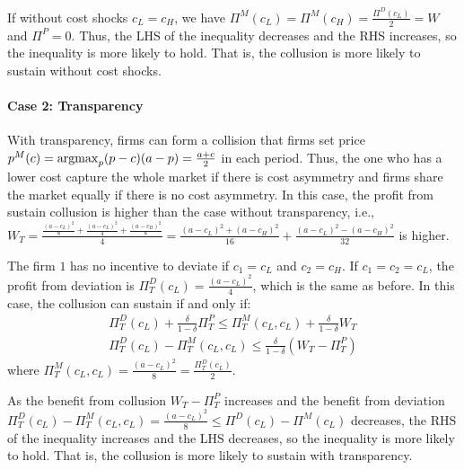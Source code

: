 \documentclass[12pt]{article}
\newcommand{\argmax}{\operatornamewithlimits{argmax}}
\begin{document}
If without cost shocks $c_L=c_H$, we have $\Pi^M(c_L)=\Pi^M(c_H)=\frac{\Pi^D(c_L)}{2}=W$ and $\Pi^P=0$. Thus, the LHS of the inequality decreases and the RHS increases, so the inequality is more likely to hold. That is, the collusion is more likely to sustain without cost shocks.

\paragraph{Case 2: Transparency}
With transparency, firms can form a collision that firms set price $p^M(c)=\argmax_p (p-c)(a-p)=\frac{a+c}{2}$ in each period. Thus, the one who has a lower cost capture the whole market if there is cost asymmetry and firms share the market equally if there is no cost asymmetry. In this case, the profit from sustain collusion is higher than the case without transparency, i.e., $W_T=\frac{\frac{(a-c_L)^2}{8}+\frac{(a-c_L)^2}{4}+\frac{(a-c_H)^2}{8}}{4}=\frac{(a-c_L)^2+(a-c_H)^2}{16}+\frac{(a-c_L)^2-(a-c_H)^2}{32}$ is higher.

The firm $1$ has no incentive to deviate if $c_1=c_L$ and $c_2=c_H$. If $c_1=c_2=c_L$, the profit from deviation is $\Pi^D_T(c_L)=\frac{(a-c_L)^2}{4}$, which is the same as before. In this case, the collusion can sustain if and only if:
\begin{equation}
    \begin{aligned}
        \Pi^D_T(c_L)+\frac{\delta}{1-\delta}\Pi^P_T\leq \Pi^M_T(c_L,c_L)+\frac{\delta}{1-\delta}W_T\\
        \Pi^D_T(c_L)-\Pi^M_T(c_L,c_L)\leq \frac{\delta}{1-\delta}(W_T-\Pi^P_T)
    \end{aligned}
    \nonumber
\end{equation}
where $\Pi^M_T(c_L,c_L)=\frac{(a-c_L)^2}{8}=\frac{\Pi^D_T(c_L)}{2}$.

As the benefit from collusion $W_T-\Pi^P_T$ increases and the benefit from deviation $\Pi^D_T(c_L)-\Pi^M_T(c_L,c_L)=\frac{(a-c_L)^2}{8}\leq\Pi^D(c_L)-\Pi^M(c_L)$ decreases, the RHS of the inequality increases and the LHS decreases, so the inequality is more likely to hold. That is, the collusion is more likely to sustain with transparency.
\end{document}
